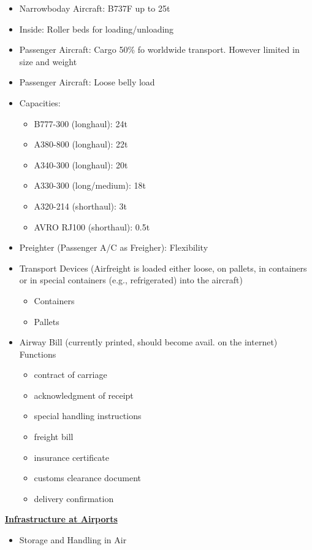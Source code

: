 \documentclass[9pt, landscape, fleqn]{scrartcl}
\begin{document}
\begin{multicols*}{3}
\begin{itemize}
    \item Narrowboday Aircraft: B737F up to 25t 
    \item Inside: Roller beds for loading/unloading 
    \item Passenger Aircraft: Cargo 50\% fo worldwide transport. However limited in size and weight 
    \item Passenger Aircraft: Loose belly load 
    \item Capacities:
    \begin{itemize}
        \item B777-300 (longhaul): 24t
        \item A380-800 (longhaul): 22t 
        \item A340-300 (longhaul): 20t
        \item A330-300 (long/medium): 18t 
        \item A320-214 (shorthaul): 3t 
        \item AVRO RJ100 (shorthaul): 0.5t
    \end{itemize}
    \item Preighter (Passenger A/C as Freigher): Flexibility 
    \item Transport Devices (Airfreight is loaded either
    loose, on pallets, in containers or in special containers (e.g., refrigerated) into the aircraft)
    \begin{itemize}
        \item Containers
        \item Pallets
    \end{itemize}
    \item Airway Bill (currently printed, should become avail. on the internet) Functions 
    \begin{itemize}
        \item contract of carriage
        \item acknowledgment of receipt
        \item special handling instructions
        \item freight bill 
        \item insurance certificate
        \item customs clearance document
        \item delivery confirmation
    \end{itemize}
\end{itemize}
\underline{\textbf{Infrastructure at Airports}}
\begin{itemize}
    \item Storage and Handling in Air

\end{itemize}
\end{multicols*}
\end{document}
